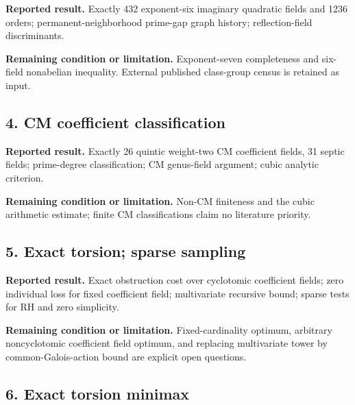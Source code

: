 \href{https://github.com/VladimirReshetnikov/ProveIt/blob/274841c1cb137aafbb60ab5f519c51fd42eee98e/docs/incoming/grh-exponent-six-and-transfers.zip}{}

\textbf{Reported result.} Exactly 432 exponent-six imaginary quadratic fields and 1236 orders; permanent-neighborhood prime-gap graph history; reflection-field discriminants.

\textbf{Remaining condition or limitation.} Exponent-seven completeness and six-field nonabelian inequality. External published class-group census is retained as input.

\subsection*{4. CM coefficient classification}

\href{https://github.com/VladimirReshetnikov/ProveIt/blob/274841c1cb137aafbb60ab5f519c51fd42eee98e/docs/incoming/grh-lean-transfers.zip}{}

\textbf{Reported result.} Exactly 26 quintic weight-two CM coefficient fields, 31 septic fields; prime-degree classification; CM genus-field argument; cubic analytic criterion.

\textbf{Remaining condition or limitation.} Non-CM finiteness and the cubic arithmetic estimate; finite CM classifications claim no literature priority.

\subsection*{5. Exact torsion; sparse sampling}

\href{https://github.com/VladimirReshetnikov/ProveIt/blob/274841c1cb137aafbb60ab5f519c51fd42eee98e/docs/incoming/grh-torsion-and-prime-sampling.zip}{}

\textbf{Reported result.} Exact obstruction cost over cyclotomic coefficient fields; zero individual loss for fixed coefficient field; multivariate recursive bound; sparse tests for RH and zero simplicity.

\textbf{Remaining condition or limitation.} Fixed-cardinality optimum, arbitrary noncyclotomic coefficient field optimum, and replacing multivariate tower by common-Galois-action bound are explicit open questions.

\subsection*{6. Exact torsion minimax}

